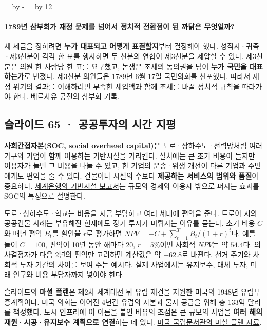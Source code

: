 \documentclass[10pt,a4paper]{article}
\newcommand{\ReserveQuestionSpace}{%
  \par\begingroup
  \dimen0=\pagegoal \advance\dimen0 by -\pagetotal
  \dimen2=\baselineskip \multiply\dimen2 by 12
  \ifdim\dimen0<\dimen2 \newpage\fi
  \endgroup}
\begin{document}
\ReserveQuestionSpace
\paragraph{1789년 삼부회가 재정 문제를 넘어서 정치적 전환점이 된 까닭은 무엇일까?}

새 세금을 정하려면 \textbf{누가 대표되고 어떻게 표결할지}부터 결정해야 했다. 성직자·귀족·제3신분이 각각 한 표를 행사하면 두 신분의 연합이 제3신분을 제압할 수 있다. 제3신분은 의원 한 사람당 한 표를 요구했고, 논쟁은 조세의 동의권을 넘어 \textbf{누가 국민을 대표하는가}로 번졌다. 제3신분 의원들은 1789년 6월 17일 국민의회를 선포했다. 따라서 재정 위기의 결과를 이해하려면 부족한 세입액과 함께 조세를 바꿀 정치적 규칙을 따라가야 한다. \href{https://www.chateauversailles.fr/decouvrir/histoire/les-grandes-dates/versailles-au-coeur-revolution-francaise}{베르사유 궁전의 삼부회 기록}.\par

\subsection{슬라이드 65 · 공공투자의 시간 지평}
\textbf{사회간접자본(SOC, social overhead capital)}은 도로·상하수도·전력망처럼 여러 가구와 기업이 함께 이용하는 기반시설을 가리킨다. 설치에는 큰 초기 비용이 들지만 이용자가 늘면 그 비용을 나눌 수 있고, 한 기업의 운송·위생 개선이 다른 기업과 주민에게도 편익을 줄 수 있다. 건물이나 시설의 수보다 \textbf{제공하는 서비스의 범위와 품질}이 중요하다. \href{https://documents1.worldbank.org/curated/en/535851468336642118/pdf/131840REPLACEMENT0WDR01994.pdf}{세계은행의 기반시설 보고서}는 규모의 경제와 이용자 밖으로 퍼지는 효과를 SOC의 특징으로 설명한다.\par

도로·상하수도·학교는 비용을 지금 부담하고 여러 세대에 편익을 준다. 트로이 시의 공공건물 사례는 부유해진 현재에도 장기 투자가 미뤄지는 이유를 묻는다. 초기 비용 $C$와 매년 편익 $B_t$를 할인율 $r$로 평가하면 $NPV=-C+\sum_{t=1}^{T}B_t/(1+r)^t$다. 예를 들어 $C=100$, 편익이 10년 동안 해마다 20, $r=5\%$이면 사회적 $NPV$는 약 $54.4$다. 의사결정자가 다음 2년의 편익만 고려하면 계산값은 약 $-62.8$로 바뀐다. 선거 주기와 사회적 투자 기간의 차이를 보여 주는 예시다. 실제 사업에서는 유지보수, 대체 투자, 미래 인구와 비용 부담자까지 넣어야 한다.\par

슬라이드의 \textbf{마셜 플랜}은 제2차 세계대전 뒤 유럽 재건을 지원한 미국의 1948년 유럽부흥계획이다. 미국 의회는 이어진 4년간 유럽의 자본과 물자 공급을 위해 총 133억 달러를 책정했다. 도시 인프라에 이 이름을 붙인 비유의 초점은 큰 규모의 사업을 \textbf{여러 해의 재원·시공·유지보수 계획으로 연결}하는 데 있다. \href{https://www.archives.gov/milestone-documents/marshall-plan}{미국 국립문서관의 마셜 플랜 자료}.\par
\end{document}

